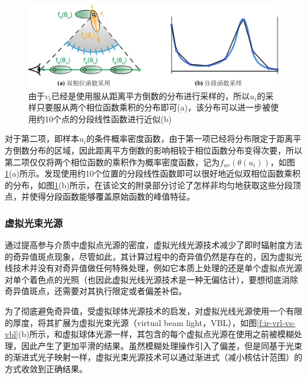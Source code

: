\begin{figure}
	\includegraphics[width=1.\textwidth]{figures/ir/vrl-piece-wise-sampling}
	\caption{由于$v_i$已经是使用服从距离平方倒数的分布进行采样的，所以$u_i$的采样只要服从两个相位函数乘积的分布即可(a)，该分布可以进一步被使用约10个点的分段线性函数进行近似(b)}
	\label{f:ir-vrl-piece-wise-sampling}
\end{figure}

对于第二项，即样本$u_i$的条件概率密度函数，由于第一项已经将分布限定于距离平方倒数分布的区域，因此距离平方倒数的影响相较于相位函数分布变得次要，所以第二项仅仅将两个相位函数的乘积作为概率密度函数，记为$f_{uv}(\theta(u_i))$，如图\ref{f:ir-vrl-piece-wise-sampling}(a)所示。\cite{a:VirtualRayLightsforRenderingSceneswithParticipatingMedia}发现使用约10个位置的分段线性函数即可以很好地近似双相位函数乘积的分布，如图\ref{f:ir-vrl-piece-wise-sampling}(b)所示，在该论文的附录部分讨论了怎样非均匀地获取这些分段顶点，并使得分段函数能够覆盖原始函数的峰值特征。




\subsubsection{虚拟光束光源}\label{sec:ir-vbl}
通过提高参与介质中虚拟点光源的密度，虚拟光线光源技术减少了即时辐射度方法的奇异值斑点现象，尽管如此，其计算过程中的奇异值仍然是存在的，因为虚拟光线技术并没有对奇异值做任何特殊处理，例如它本质上处理的还是单个虚拟点光源对单个着色点的光照（也因此虚拟光线光源技术是一种无偏估计），要想彻底消除奇异值斑点，还需要对其执行限定或者偏差补偿。

为了彻底避免奇异值，受虚拟球体光源技术的启发，\cite{a:ProgressiveVirtualBeamLights}对虚拟光线光源使用一个有限的厚度，将其扩展为虚拟光束光源（virtual beam light，VBL），如图\ref{f:ir-vrl-vs-vbl}(b)所示，和虚拟球体光源一样，其包含的每个虚拟点光源在使用之前被模糊处理，因此产生了更加平滑的结果。虽然模糊处理操作引入了偏差，但是同基于光束的渐进式光子映射一样，虚拟光束光源技术可以通过渐进式（减小核估计范围）的方式收敛到正确结果。


